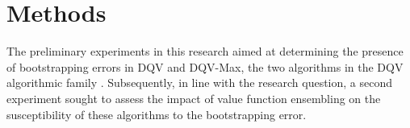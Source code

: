 \section{Methods}\label{sec:methods}
The preliminary experiments in this research aimed at determining the
presence of bootstrapping errors in DQV and DQV-Max, the two
algorithms in the DQV algorithmic family \citep{sabatelli2020deep}.
Subsequently, in line with the research question, a second experiment
sought to assess the impact of value function ensembling on the
susceptibility of these algorithms to the bootstrapping error.

